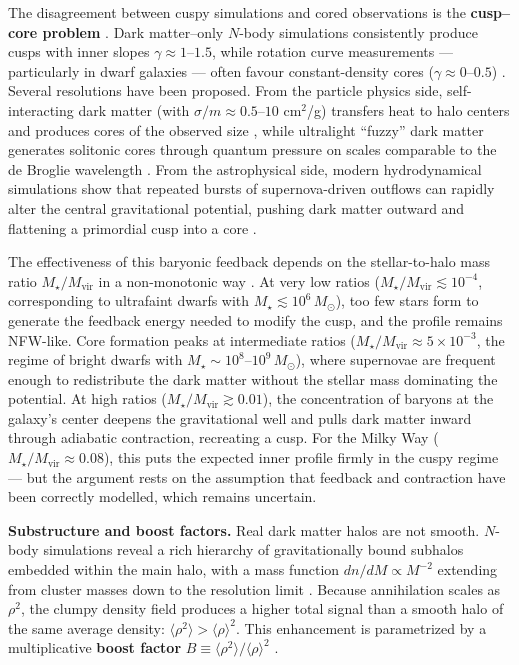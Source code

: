 The disagreement between cuspy simulations and cored observations is the \textbf{cusp--core problem} \cite{Cirelli:2024ssz,Bullock:2017xww}.
Dark matter--only $N$-body simulations consistently produce cusps with inner slopes $\gamma \approx 1$--$1.5$, while rotation curve measurements --- particularly in dwarf galaxies --- often favour constant-density cores ($\gamma \approx 0$--$0.5$) \cite{Bullock:2017xww}.
Several resolutions have been proposed.
From the particle physics side, self-interacting dark matter (with $\sigma/m \approx 0.5$--$10$ cm$^2$/g) transfers heat to halo centers and produces cores of the observed size \cite{Cirelli:2024ssz,Bullock:2017xww}, while ultralight ``fuzzy'' dark matter generates solitonic cores through quantum pressure on scales comparable to the de Broglie wavelength \cite{Cirelli:2024ssz}.
From the astrophysical side, modern hydrodynamical simulations show that repeated bursts of supernova-driven outflows can rapidly alter the central gravitational potential, pushing dark matter outward and flattening a primordial cusp into a core \cite{Cirelli:2024ssz,Bullock:2017xww}.

The effectiveness of this baryonic feedback depends on the stellar-to-halo mass ratio $M_\star / M_\text{vir}$ in a non-monotonic way \cite{Cirelli:2024ssz,Bullock:2017xww}.
At very low ratios ($M_\star / M_\text{vir} \lesssim 10^{-4}$, corresponding to ultrafaint dwarfs with $M_\star \lesssim 10^6\, M_\odot$), too few stars form to generate the feedback energy needed to modify the cusp, and the profile remains NFW-like.
Core formation peaks at intermediate ratios ($M_\star / M_\text{vir} \approx 5 \times 10^{-3}$, the regime of bright dwarfs with $M_\star \sim 10^{8}$--$10^{9}\, M_\odot$), where supernovae are frequent enough to redistribute the dark matter without the stellar mass dominating the potential.
At high ratios ($M_\star / M_\text{vir} \gtrsim 0.01$), the concentration of baryons at the galaxy's center deepens the gravitational well and pulls dark matter inward through adiabatic contraction, recreating a cusp.
For the Milky Way ($M_\star / M_\text{vir} \approx 0.08$), this puts the expected inner profile firmly in the cuspy regime \cite{Cirelli:2024ssz} --- but the argument rests on the assumption that feedback and contraction have been correctly modelled, which remains uncertain.

\textbf{Substructure and boost factors.}
Real dark matter halos are not smooth.
$N$-body simulations reveal a rich hierarchy of gravitationally bound subhalos embedded within the main halo, with a mass function $dn/dM \propto M^{-2}$ extending from cluster masses down to the resolution limit \cite{Cirelli:2024ssz,Springel:2008cc}.
Because annihilation scales as $\rho^2$, the clumpy density field produces a higher total signal than a smooth halo of the same average density: $\langle \rho^2 \rangle > \langle \rho \rangle^2$.
This enhancement is parametrized by a multiplicative \textbf{boost factor} $B \equiv \langle \rho^2 \rangle / \langle \rho \rangle^2$ \cite{Cirelli:2024ssz}.

